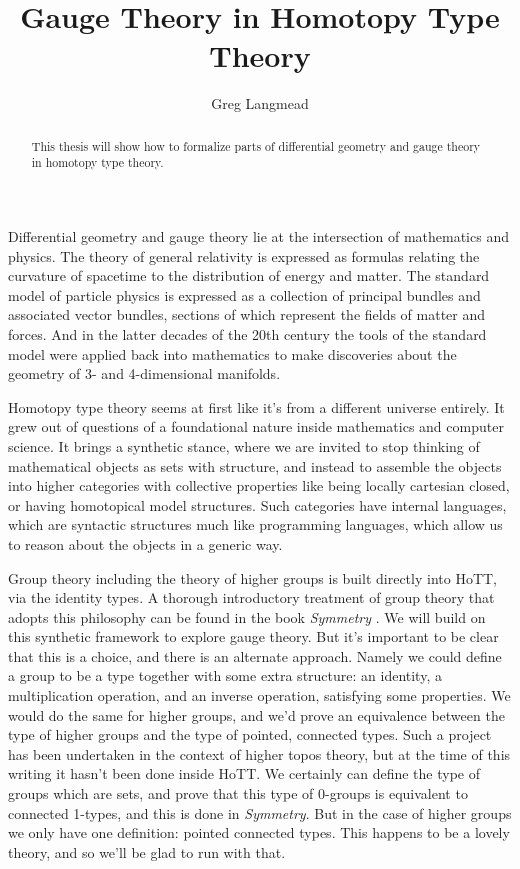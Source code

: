 \documentclass[14pt]{extarticle}
\title{Gauge Theory in Homotopy Type Theory}
\author{Greg Langmead}
\begin{document}
\maketitle
\begin{abstract}
This thesis will show how to formalize parts of differential geometry and gauge theory in homotopy type theory.\cite{freed2013chernweil} \cite{kobayashinomizu} \cite{hamilton2017} \cite{scorpan_wild_2005} \cite{baez1994gauge} \cite{atiyah1983yang}
\end{abstract}
\tableofcontents
{}
Differential geometry and gauge theory lie at the intersection of mathematics and physics. The theory of general relativity is expressed as formulas relating the curvature of spacetime to the distribution of energy and matter. The standard model of particle physics is expressed as a collection of principal bundles and associated vector bundles, sections of which represent the fields of matter and forces. And in the latter decades of the 20th century the tools of the standard model were applied back into mathematics to make discoveries about the geometry of 3- and 4-dimensional manifolds.

Homotopy type theory seems at first like it's from a different universe entirely. It grew out of questions of a foundational nature inside mathematics and computer science. It brings a synthetic stance, where we are invited to stop thinking of mathematical objects as sets with structure, and instead to assemble the objects into higher categories with collective properties like being locally cartesian closed, or having homotopical model structures. Such categories have internal languages, which are syntactic structures much like programming languages, which allow us to reason about the objects in a generic way.

Group theory including the theory of higher groups is built directly into HoTT, via the identity types. A thorough introductory treatment of group theory that adopts this philosophy can be found in the book \emph{Symmetry} \cite{Symmetry}. We will build on this synthetic framework to explore gauge theory. But it's important to be clear that this is a choice, and there is an alternate approach. Namely we could define a group to be a type together with some extra structure: an identity, a multiplication operation, and an inverse operation, satisfying some properties. We would do the same for higher groups, and we'd prove an equivalence between the type of higher groups and the type of pointed, connected types. Such a project has been undertaken in the context of higher topos theory, but at the time of this writing it hasn't been done inside HoTT. We certainly can define the type of groups which are sets, and prove that this type of 0-groups is equivalent to connected 1-types, and this is done in \emph{Symmetry}. But in the case of higher groups we only have one definition: pointed connected types. This happens to be a lovely theory, and so we'll be glad to run with that.
\end{document}
